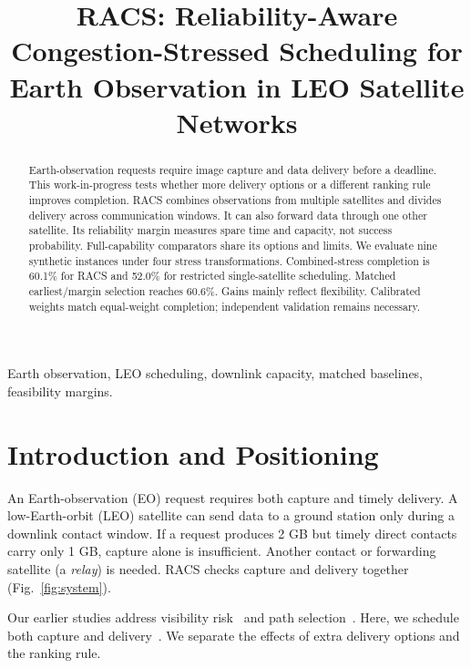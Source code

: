 \documentclass[conference]{IEEEtran}
\begin{document}
\title{RACS: Reliability-Aware Congestion-Stressed Scheduling for Earth Observation in LEO Satellite Networks}
\author{
}
\maketitle

\begin{abstract}
Earth-observation requests require image capture and data delivery before a deadline. This work-in-progress tests whether more delivery options or a different ranking rule improves completion. RACS combines observations from multiple satellites and divides delivery across communication windows. It can also forward data through one other satellite. Its reliability margin measures spare time and capacity, not success probability. Full-capability comparators share its options and limits. We evaluate nine synthetic instances under four stress transformations. Combined-stress completion is 60.1\% for RACS and 52.0\% for restricted single-satellite scheduling. Matched earliest/margin selection reaches 60.6\%. Gains mainly reflect flexibility. Calibrated weights match equal-weight completion; independent validation remains necessary.
\end{abstract}
\begin{IEEEkeywords}
Earth observation, LEO scheduling, downlink capacity, matched baselines, feasibility margins.
\end{IEEEkeywords}

\section{Introduction and Positioning}
An Earth-observation (EO) request requires both capture and timely delivery. A low-Earth-orbit (LEO) satellite can send data to a ground station only during a downlink contact window. If a request produces 2 GB but timely direct contacts carry only 1 GB, capture alone is insufficient. Another contact or forwarding satellite (a \emph{relay}) is needed. RACS checks capture and delivery together (Fig.~\ref{fig:system}).

Our earlier studies address visibility risk~\cite{deepak_visibility} and path selection~\cite{deepak_disagreement}. Here, we schedule both capture and delivery~\cite{ferrari}. We separate the effects of extra delivery options and the ranking rule.
\end{document}
